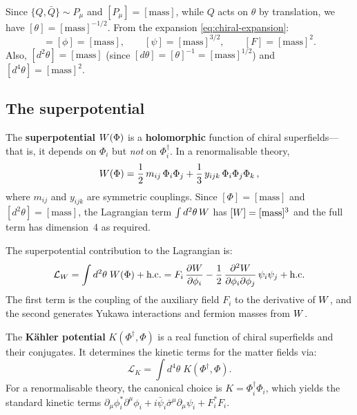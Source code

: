 \documentclass[11pt,a4paper]{article}
\begin{document}
\begin{definition}
\label{def:superspace-dims}
Since $\{Q, \bar{Q}\} \sim P_\mu$ and $[P_\mu] = [\text{mass}]$,
while $Q$ acts on $\theta$ by translation, we have
$[\theta] = [\text{mass}]^{-1/2}$.  From the expansion
\eqref{eq:chiral-expansion}:
\begin{equation}
  [\Phi] = [\phi] = [\text{mass}], \qquad
  [\psi] = [\text{mass}]^{3/2}, \qquad
  [F] = [\text{mass}]^2.
  \label{eq:chiral-dims}
\end{equation}
Also, $[d^2\theta] = [\text{mass}]$ (since $[d\theta] = [\theta]^{-1}
= [\text{mass}]^{1/2}$) and $[d^4\theta] = [\text{mass}]^2$.
\end{definition}


\subsection{The superpotential}
\label{sec:superpotential}

\begin{definition}[Superpotential]
\label{def:superpotential}
The \textbf{superpotential} $W(\Phi)$ is a \textbf{holomorphic}
function of chiral superfields---that is, it depends on $\Phi_i$ but
\emph{not} on $\Phi_i^\dagger$.  In a renormalisable theory,
\begin{equation}
  W(\Phi) = \frac{1}{2}\, m_{ij}\, \Phi_i \Phi_j
  + \frac{1}{3}\, y_{ijk}\, \Phi_i \Phi_j \Phi_k\,,
  \label{eq:superpotential-general}
\end{equation}
where $m_{ij}$ and $y_{ijk}$ are symmetric couplings.  Since $[\Phi] =
[\text{mass}]$ and $[d^2\theta] = [\text{mass}]$, the Lagrangian term
$\int d^2\theta\, W$ has $[W] = [\text{mass}]^3$ and the
full term has dimension~4 as required.
\end{definition}

The superpotential contribution to the Lagrangian is:
\begin{equation}
  \mathcal{L}_W
  = \int d^2\theta\; W(\Phi) + \text{h.c.}
  = F_i\, \frac{\partial W}{\partial \phi_i}
  - \frac{1}{2}\, \frac{\partial^2 W}{\partial \phi_i \partial \phi_j}\,
  \psi_i \psi_j + \text{h.c.}
  \label{eq:Lsuperpotential}
\end{equation}
The first term is the coupling of the auxiliary field $F_i$ to the
derivative of $W$, and the second generates Yukawa interactions
and fermion masses from $W$.

\begin{definition}
\label{def:kahler}
The \textbf{K\"ahler potential} $K(\Phi^\dagger, \Phi)$ is a real
function of chiral superfields and their conjugates.  It determines the
kinetic terms for the matter fields via:
\begin{equation}
  \mathcal{L}_K = \int d^4\theta\; K(\Phi^\dagger, \Phi).
  \label{eq:kahler-lagrangian}
\end{equation}
For a renormalisable theory, the canonical choice is
$K = \Phi_i^\dagger \Phi_i$, which yields the standard kinetic terms
$\partial_\mu \phi_i^* \partial^\mu \phi_i + i\bar\psi_i \bar\sigma^\mu
\partial_\mu \psi_i + F_i^* F_i$.
\end{definition}
\end{document}
